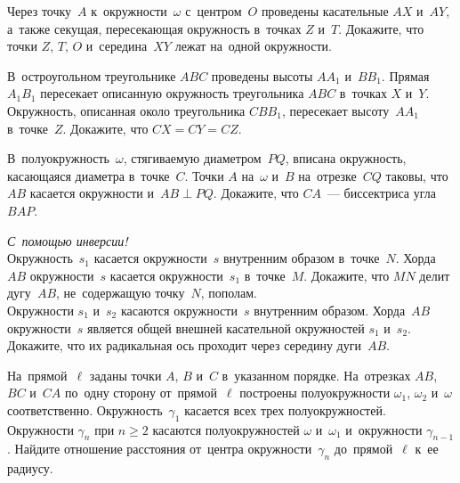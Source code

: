 


\begin{problems}

\item
Через точку~$A$ к~окружности~$\omega$ с~центром~$O$ проведены
касательные $AX$ и~$AY$, а~также секущая, пересекающая окружность
в~точках $Z$ и~$T$.
Докажите, что точки $Z$, $T$, $O$ и~середина~$XY$ лежат на~одной окружности.

\item
В~остроугольном треугольнике $ABC$ проведены высоты $AA_{1}$ и~$BB_{1}$.
Прямая~$A_{1}B_{1}$ пересекает описанную окружность треугольника $ABC$
в~точках $X$ и~$Y$.
Окружность, описанная около треугольника $CBB_{1}$, пересекает высоту~$AA_{1}$
в~точке~$Z$.
Докажите, что $CX = CY = CZ$.

\item
В~полуокружность~$\omega$, стягиваемую диаметром~$PQ$, вписана окружность,
касающаяся диаметра в~точке~$C$.
Точки $A$ на~$\omega$ и~$B$ на~отрезке~$CQ$ таковы, что $AB$ касается
окружности и~$AB \perp PQ$.
Докажите, что $CA$~--- биссектриса угла $BAP$.

\item\emph{С~помощью инверсии!}\\
\subproblem
Окружность~$s_{1}$ касается окружности~$s$ внутренним образом в~точке~$N$.
Хорда~$AB$ окружности~$s$ касается окружности~$s_{1}$ в~точке~$M$.
Докажите, что $MN$ делит дугу~$AB$, не~содержащую точку~$N$, пополам.
\\
\subproblem
Окружности $s_{1}$ и~$s_{2}$ касаются окружности~$s$ внутренним образом.
Хорда~$AB$ окружности~$s$ является общей внешней касательной
окружностей $s_{1}$ и~$s_{2}$.
Докажите, что их радикальная ось проходит через середину дуги~$AB$.

\item
На~прямой~$\ell$ заданы точки $A$, $B$ и~$C$ в~указанном порядке.
На~отрезках $AB$, $BC$ и~$CA$ по~одну сторону от~прямой~$\ell$ построены
полуокружности $\omega_{1}$, $\omega_{2}$ и~$\omega$ соответственно.
Окружность~$\gamma_{1}$ касается всех трех полуокружностей.
Окружности $\gamma_{n}$ при $n \geq 2$ касаются
полуокружностей $\omega$ и~$\omega_{1}$ и~окружности $\gamma_{n-1}$.
Найдите отношение расстояния от~центра окружности~$\gamma_{n}$ до~прямой~$\ell$
к~ее радиусу.


\end{problems}
